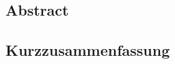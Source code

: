 {
  \let\raggedsection\centering
  \subsection*{Abstract}
}
\newpage
{
  \let\raggedsection\centering
  \subsection*{Kurzzusammenfassung}
}

